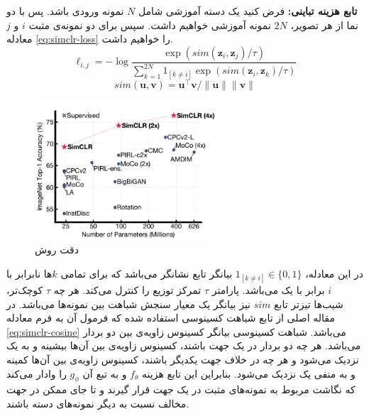 \noindent\textbf{تابع هزینه تباینی:}
فرض کنید یک دسته آموزشی شامل $N$
نمونه ورودی باشد. پس با دو نما از هر تصویر،
$2N$
نمونه آموزشی خواهیم داشت. سپس برای دو نمونه‌ی مثبت $i$ و $j$ معادله
\ref{eq:simclr-loss} را خواهیم داشت.
\begin{equation}
\label{eq:simclr-loss}
    \ell_{i,j} = -\log \frac{\exp(sim(\boldsymbol{z}_i, \boldsymbol{z}_j) / \tau)}{\sum_{k=1}^{2N} 1_{[k \neq i]} \exp(sim(\boldsymbol{z}_i, \boldsymbol{z}_k) / \tau)}
\end{equation}
\begin{equation}
    \label{eq:simclr-cosine}
    sim(\boldsymbol{u}, \boldsymbol{v}) = \boldsymbol{u}^\top \boldsymbol{v} / \|\boldsymbol{u}\| \|\boldsymbol{v}\|
\end{equation}
\begin{figure}[t]
\centering
\includegraphics[width=0.6\textwidth]{Images/Chapter2/simclr-results.png}
\caption{دقت روش }
\label{fig:simclr-results}
\end{figure}
در این معادله،
$1_{[k \neq i]}\in\{0,1\}$
بیانگر تابع نشانگر
می‌باشد که برای تمامی $k$ها
نابرابر با $i$
برابر با یک می‌باشد.
پارامتر $\tau$
تمرکز توزیع را کنترل می‌کند. هر چه
$\tau$
کوچک‌تر، شیب‌ها تیزتر
تابع $sim$
نیز بیانگر یک معیار سنجش شباهت بین نمونه‌ها می‌باشد. در مقاله اصلی از تابع
شباهت کسینوسی
استفاده شده که فرمول آن به فرم معادله
\ref{eq:simclr-cosine} می‌باشد.
شباهت کسینوسی بیانگر کسینوس زاویه‌ی بین دو بردار می‌باشد. هر چه دو بردار در یک جهت باشند، کسینوس زاویه‌ی بین آن‌ها بیشینه و به یک نزدیک می‌شود و هر چه در خلاف جهت یکدیگر باشند، کسینوس زاویه‌ی بین آن‌ها کمینه و به  منفی یک نزدیک می‌شود. بنابراین این تابع هزینه
$f_\theta$ و به تبع آن $g_\phi$
را وادار می‌کند که نگاشت مربوط به نمونه‌های مثبت در یک جهت قرار گیرند و تا جای ممکن در جهت مخالف نسبت به دیگر نمونه‌های دسته باشند.

